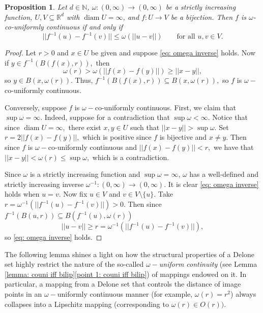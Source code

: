 \documentclass{article}
\newtheorem{prop}[define]{Proposition}
\newcommand{\R}{\mathbb{R}}
\newcommand{\N}{\mathbb{N}}
\DeclareMathOperator{\diam}{diam}
\begin{document}
\begin{prop} \label{prop: iff holder couniformity} Let $d \in \N$, $\omega:(0,\infty) \to (0,\infty)$ be a strictly increasing function, $U, V \subseteq \R^d$ with $\diam U = \infty$, and $f:U\to V$ be a bijection. Then $f$ is $\omega$-co-uniformly continuous if and only if
\begin{equation}\label{eq: omega inverse}
    ||f^{-1}(u)-f^{-1}(v)|| \leq \omega(||u-v||) \qquad \text{for all $u,v \in V$}.
\end{equation}
\end{prop} 
\begin{proof}
     Let $r>0$ and $x \in U$ be given and suppose \eqref{eq: omega inverse} holds. Now if $y \in f^{-1}(B(f(x),r)),$ then
     $$\omega(r)> \omega(||f(x)-f(y)||) \geq ||x-y||,$$
     so $y \in B(x, \omega(r)).$ Thus, $f^{-1}(B(f(x),r)) \subseteq B(x,\omega(r)),$ so $f$ is $\omega-$co-uniformly continuous.

    Conversely, suppose $f$ is $\omega-$co-uniformly continuous. 
    First, we claim that $\sup \omega = \infty.$ Indeed, suppose for a contradiction that $\sup \omega < \infty.$ Notice that since $\diam U = \infty,$ there exist $x,y \in U$ such that $||x-y|| > \sup \omega.$ Set $r = 2||f(x)-f(y)||,$ which is positive since $f$ is bijective and $x \neq y.$ Then since $f$ is $\omega-$co-uniformly continuous and $||f(x)-f(y)|| <r,$ we have that $||x-y|| < \omega(r) \leq \sup \omega,$ which is a contradiction. 
    
   Since $\omega$ is a strictly increasing function and $\sup \omega = \infty$, $\omega$ has a well-defined and strictly increasing inverse ${\omega^{-1}:(0, \infty) \to (0, \infty)}$. It is clear \eqref{eq: omega inverse} holds when $u = v.$
    Now fix $u \in V$ and $v \in V\setminus \{u\}.$ Take $r = \omega^{-1}(||f^{-1}(u)-f^{-1}(v)||)>0$. Then since $f^{-1}(B(u,r)) \subseteq B(f^{-1}(u), \omega(r))$ $$||u-v|| \geq r = \omega^{-1}(||f^{-1}(u)-f^{-1}(v)||),$$ so \eqref{eq: omega inverse} holds.
\end{proof}
The following lemma shines a light on how the structural properties of a Delone set highly restrict the nature of the so-called \textit{$\omega-$uniform continuity} (see Lemma \ref{lemma: couni iff bilip}\eqref{point 1: couni iff bilip}) of mappings endowed on it. In particular, a mapping from a Delone set that controls the distance of image points in an $\omega-$uniformly continuous manner (for example, $\omega(r) = r^2$) always collapses into a Lipschitz mapping (corresponding to $\omega(r) \in O(r))$.
\end{document}
